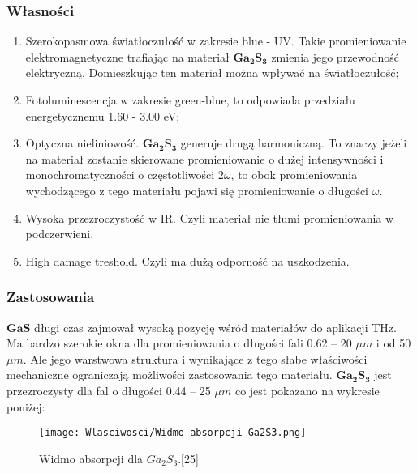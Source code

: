 \subsubsection{Własności}
\begin{enumerate}
	\item Szerokopasmowa światłoczułość w zakresie blue - UV. Takie promieniowanie elektromagnetyczne trafiając na materiał $\mathbf{Ga_{2}S_{3}}$ zmienia jego przewodność elektryczną. Domieszkując ten materiał można wpływać na światłoczułość;
	\item Fotoluminescencja w zakresie green-blue, to odpowiada przedziału energetycznemu 1.60 - 3.00 eV;
	\item Optyczna nieliniowość. $\mathbf{Ga_{2}S_{3}}$ generuje drugą harmoniczną. To znaczy jeżeli na materiał zostanie skierowane promieniowanie o dużej intensywności i monochromatyczności o częstotliwości $2\omega$, to obok promieniowania wychodzącego z tego materiału pojawi się promieniowanie o długości $\omega$.
	\item Wysoka przezroczystość w IR. Czyli materiał nie tłumi promieniowania w podczerwieni.
	\item High damage treshold. Czyli ma dużą odporność na uszkodzenia.
\end{enumerate}

\subsubsection{Zastosowania}

$\mathbf{GaS}$ długi czas zajmował wysoką pozycję wśród materiałów do aplikacji THz. Ma bardzo szerokie okna dla promieniowania o długości fali 0.62 – 20 $\mu m$ i od 50 $\mu m$. Ale jego warstwowa struktura i wynikające z tego słabe właściwości mechaniczne ograniczają możliwości zastosowania tego materiału. $\mathbf{Ga_{2}S_{3}}$ jest przezroczysty dla fal o długości 0.44 – 25 $\mu m$ co jest pokazano na wykresie poniżej:

\begin{figure}[H]
	\begin{center}
		\texttt{[image: Wlasciwosci/Widmo-absorpcji-Ga2S3.png]}
		\caption{Widmo absorpcji dla $Ga_{2}S_{3}$.[25]}
	\end{center}
\end{figure}

